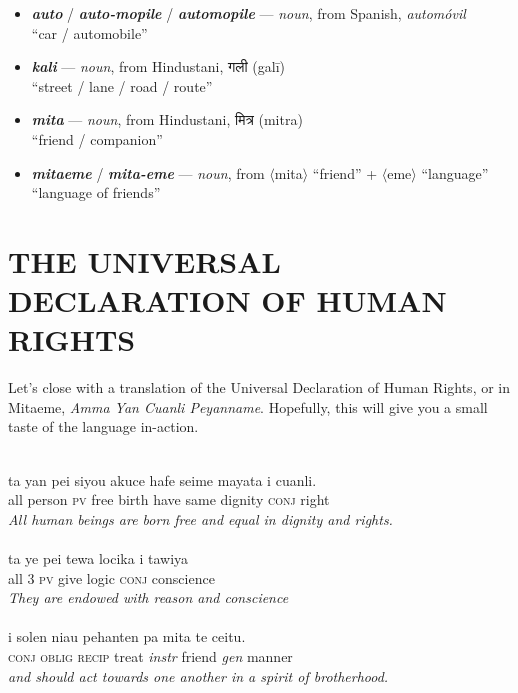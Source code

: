 \documentclass[a4paper, titlepage]{article}
\begin{document}
\begin{itemize}
	\item \textbf{\textit{auto}} / \textbf{\textit{auto-mopile}} / \textbf{\textit{automopile}}  — \textit{noun}, from Spanish, \textit{automóvil} \\``car / automobile''
	\item \textbf{\textit{kali}}  — \textit{noun}, from Hindustani, {\hmfont गली} (galī) \\ ``street / lane / road / route''
	\item \textbf{\textit{mita}}  — \textit{noun}, from Hindustani, {\hmfont मित्र} (mitra) \\ ``friend / companion''
	\item \textbf{\textit{mitaeme}} / \textbf{\textit{mita-eme}}  — \textit{noun}, from $\langle$mita$\rangle$ ``friend'' + $\langle$eme$\rangle$ ``language'' \\ ``language of friends''
	
\end{itemize}

\section{THE UNIVERSAL DECLARATION OF HUMAN RIGHTS}

Let's close with a translation of the Universal Declaration of Human Rights, or in Mitaeme, \textit{Amma Yan Cuanli Peyanname}.
Hopefully, this will give you a small taste of the language in-action.\\
\\
\hspace*{1cm}%
\begin{minipage}{.8\textwidth}%
ta yan pei siyou akuce hafe seime mayata i cuanli.\\
all person \textsc{pv} free birth have same dignity \textsc{conj} right\\
\textit{All human beings are born free and equal in dignity and rights.}\\
\\
ta ye pei tewa locika i tawiya\\
all \textsc{3 pv} give logic \textsc{conj} conscience\\
\textit{They are endowed with reason and conscience}\\
\\
i solen niau pehanten pa mita te ceitu.\\
\textsc{conj oblig recip} treat \textit{instr} friend \textit{gen} manner\\
\textit{and should act towards one another in a spirit of brotherhood.}
\end{minipage}%
\end{document}
